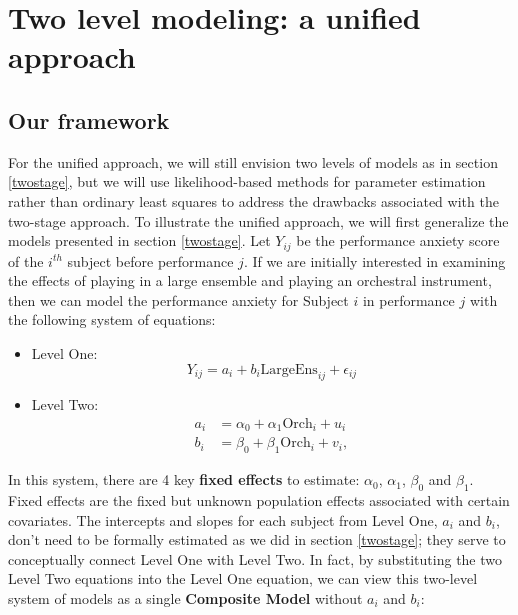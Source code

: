\documentclass[
]{krantz}
\providecommand{\tightlist}{%
  \setlength{\itemsep}{0pt}\setlength{\parskip}{0pt}}
\begin{document}
\hypertarget{twolevelmodelingunified}{%
\section{Two level modeling: a unified approach}\label{twolevelmodelingunified}}

\hypertarget{ourframework}{%
\subsection{Our framework}\label{ourframework}}

For the unified approach, we will still envision two levels of models as in section \ref{twostage}, but we will use likelihood-based methods for parameter estimation rather than ordinary least squares to address the drawbacks associated with the two-stage approach. To illustrate the unified approach, we will first generalize the models presented in section \ref{twostage}. Let \(Y_{ij}\) be the performance anxiety score of the \(i^{th}\) subject before performance \(j\). If we are initially interested in examining the effects of playing in a large ensemble and playing an orchestral instrument, then we can model the performance anxiety for Subject \(i\) in performance \(j\) with the following system of equations:

\begin{itemize}
\tightlist
\item
  Level One:
  \begin{equation*}
  Y_{ij} = a_{i}+b_{i}\textrm{LargeEns}_{ij}+\epsilon_{ij}
  \end{equation*}
\item
  Level Two:
  \begin{align*}
  a_{i} & = \alpha_{0}+\alpha_{1}\textrm{Orch}_{i}+u_{i} \\
  b_{i} & = \beta_{0}+\beta_{1}\textrm{Orch}_{i}+v_{i},
  \end{align*}
\end{itemize}

In this system, there are 4 key \textbf{fixed effects} to estimate: \(\alpha_{0}\), \(\alpha_{1}\), \(\beta_{0}\) and \(\beta_{1}\). Fixed effects are the fixed but unknown population effects associated with certain covariates. The intercepts and slopes for each subject from Level One, \(a_{i}\) and \(b_{i}\), don't need to be formally estimated as we did in section \ref{twostage}; they serve to conceptually connect Level One with Level Two. In fact, by substituting the two Level Two equations into the Level One equation, we can view this two-level system of models as a single \textbf{Composite Model}  without \(a_{i}\) and \(b_{i}\):
\end{document}
